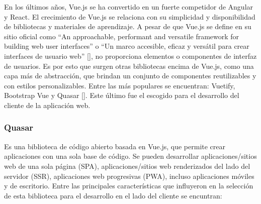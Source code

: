 

En los últimos años, Vue.js se ha convertido
en un fuerte competidor de Angular y React. El 
crecimiento de Vue.js se relaciona con su simplicidad 
y disponibilidad de bibliotecas y materiales de aprendizaje. A pesar de que Vue.js se define en su sitio oficial como ``An approachable, performant and versatile framework for building web user interfaces''
o ``Un marco accesible, eficaz y versátil para crear interfaces de usuario web'' [\cite{vuejs}],
no proporciona elementos o componentes de interfaz de usuarios. Es por esto que surgen  
otras bibliotecas encima de Vue.js, como una capa más de abstracción, que 
brindan un conjunto de componentes reutilizables y con estilos personalizables. Entre 
las más populares se encuentran: Vuetify, Bootstrap Vue y Quasar [\cite{vuejs-frameworks}].
Este último fue el escogido para el desarrollo del cliente de la aplicación web. 
  



\subsubsection{Quasar}
Es una biblioteca de código abierto basada en Vue.js,
que permite crear aplicaciones con una sola base de código.
Se pueden desarrollar aplicaciones/sitios web de una sola página (SPA),
aplicaciones/sitios web renderizados del lado del servidor (SSR),
aplicaciones web progresivas (PWA), incluso aplicaciones móviles y de 
escritorio.
Entre las principales características que influyeron en la selección de esta biblioteca 
para el desarrollo en el lado del cliente se encuntran: 

